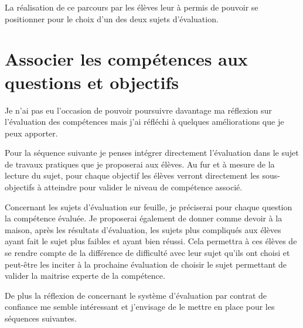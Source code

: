 La réalisation de ce parcours par les élèves leur à permis de pouvoir se positionner pour le choix d'un des deux sujets d'évaluation.


\section{Associer les compétences aux questions et objectifs}

Je n'ai pas eu l'occasion de pouvoir poursuivre davantage ma réflexion sur l'évaluation des compétences mais j'ai réfléchi à quelques améliorations que je peux apporter.

Pour la séquence suivante je penses intégrer directement l'évaluation dans le sujet de travaux pratiques que je proposerai aux élèves.
Au fur et à mesure de la lecture du sujet, pour chaque objectif les élèves verront directement les sous-objectifs à atteindre pour valider le niveau de compétence associé.

Concernant les sujets d'évaluation sur feuille, je préciserai pour chaque question la compétence évaluée.
Je proposerai également de donner comme devoir à la maison, après les résultats d'évaluation, les sujets plus compliqués aux élèves ayant fait le sujet plus faibles et ayant bien réussi.
Cela permettra à ces élèves de se rendre compte de la différence de difficulté avec leur sujet qu'ils ont choisi et peut-être les inciter à la prochaine évaluation de choisir le sujet permettant de valider la maitrise experte de la compétence.

De plus la réflexion de \cite{antibi2007notes} concernant le système d'évaluation par contrat de confiance me semble intéressant et j'envisage de le mettre en place pour les séquences suivantes.



